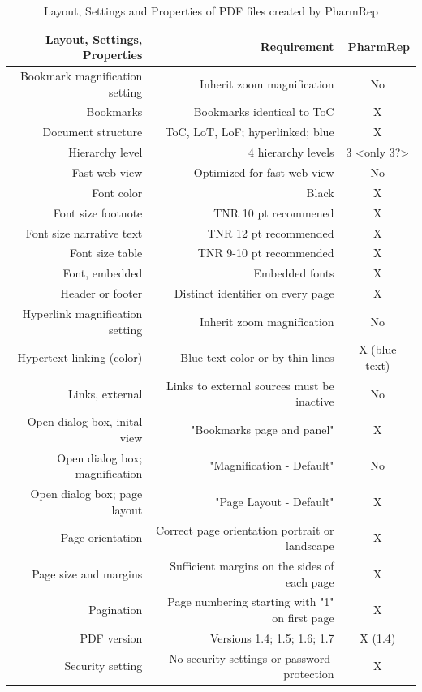 \documentclass{pharmrep}
\newcommand{\PharmRep}{\textsf{PharmRep}\xspace}
\begin{document}
\begin{table}[htbp]
\centering
\caption{Layout, Settings and Properties of PDF files created by \PharmRep}\label{tab:PDFProp}
\begin{tabular}{rrr}
\toprule
Layout, Settings, Properties & Requirement & PharmRep \\
\midrule
Bookmark magnification setting  & Inherit zoom magnification & \multicolumn{1}{c}{No} \\
Bookmarks & Bookmarks identical to ToC & \multicolumn{1}{c}{X} \\
Document structure & ToC, LoT, LoF; hyperlinked; blue  & \multicolumn{1}{c}{X} \\
Hierarchy level & 4 hierarchy levels & \multicolumn{1}{c}{3 <only 3?>} \\
Fast web view  & Optimized for fast web view & \multicolumn{1}{c}{No} \\
Font color & Black  & \multicolumn{1}{c}{X} \\
Font size footnote & TNR 10 pt recommened & \multicolumn{1}{c}{X} \\
Font size narrative text & TNR 12 pt recommended & \multicolumn{1}{c}{X} \\
Font size table & TNR 9-10 pt recommended & \multicolumn{1}{c}{X} \\
Font, embedded & Embedded fonts  & \multicolumn{1}{c}{X} \\
Header or footer & Distinct identifier on every page & \multicolumn{1}{c}{X} \\
Hyperlink magnification setting & Inherit zoom magnification & \multicolumn{1}{c}{No} \\
Hypertext linking (color) & Blue text color or by thin lines  & \multicolumn{1}{c}{X (blue text)} \\
Links, external & Links to external sources must be inactive  & \multicolumn{1}{c}{No} \\
Open dialog box, inital view & "Bookmarks page and panel"  & \multicolumn{1}{c}{X} \\
Open dialog box; magnification & "Magnification - Default" & \multicolumn{1}{c}{No } \\
Open dialog box; page layout & "Page Layout - Default" & \multicolumn{1}{c}{X} \\
Page orientation & Correct page orientation portrait or landscape & \multicolumn{1}{c}{X} \\
Page size and margins & Sufficient margins on the sides of each page & \multicolumn{1}{c}{X} \\
Pagination & Page numbering starting with "1" on first page & \multicolumn{1}{c}{X} \\
PDF version & Versions 1.4; 1.5; 1.6; 1.7  & \multicolumn{1}{c}{X (1.4)} \\
Security setting & No security settings or password-protection  & \multicolumn{1}{c}{X} \\
\bottomrule
\end{tabular}%
\label{tab:addlabel}%
\end{table}%
\end{document}
